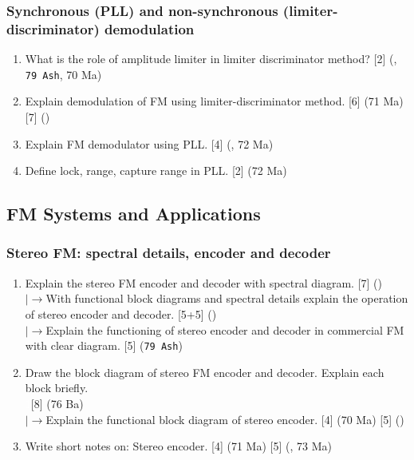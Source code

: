 \documentclass[12pt]{article}
\newcommand{\lb}{\\$\left|\rightarrow\right.$}
\newcommand{\enter}{\\\textcolor{white}{1}}
\begin{document}
    \subsubsection{Synchronous (PLL) and non-synchronous (limiter-discriminator) demodulation}
      \begin{enumerate}
        \item What is the role of amplitude limiter in limiter discriminator method? \hfill [2] (, \texttt{79 Ash}, 70 Ma)

        \item Explain demodulation of FM using limiter-discriminator method. \hfill [6] (71 Ma) [7] ()

        \item Explain FM demodulator using PLL. \hfill [4] (, 72 Ma)

        \item Define lock, range, capture range in PLL. \hfill [2] (72 Ma)
      \end{enumerate}

  \subsection{FM Systems and Applications}
    \subsubsection{Stereo FM: spectral details, encoder and decoder}
      \begin{enumerate}
        \item Explain the stereo FM encoder and decoder with spectral diagram. \hfill [7] ()
        \lb With functional block diagrams and spectral details explain the operation of stereo encoder and decoder. \hfill [5+5] ()
        \lb Explain the functioning of stereo encoder and decoder in commercial FM with clear diagram. \hfill [5] (\texttt{79 Ash})

        \item Draw the block diagram of stereo FM encoder and decoder. Explain each block briefly.
        \enter\hfill [8] (76 Ba)
        \lb Explain the functional block diagram of stereo encoder. \hfill [4] (70 Ma) [5] ()

        \item Write short notes on: Stereo encoder. \hfill [4] (71 Ma) [5] (, 73 Ma)
      \end{enumerate}
\end{document}
